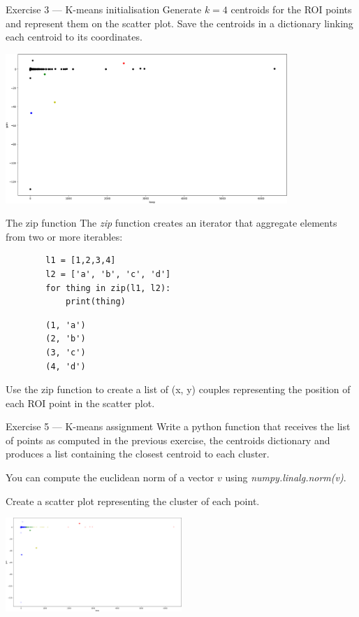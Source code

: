 \documentclass[aspectratio=169,]{beamer}
\begin{document}
\begin{frame}{Exercise 3 --- K-means initialisation}
    Generate $k=4$ centroids for the ROI points and represent them on the scatter plot.
    Save the centroids in a dictionary linking each centroid to its coordinates.

    \includegraphics[width=0.8\textwidth]{./kmeans-init.png}
\end{frame}

\begin{frame}[fragile]{The zip function}
    The \emph{zip} function creates an iterator that aggregate elements from two or more iterables:
    \begin{verbatim}
        l1 = [1,2,3,4]
        l2 = ['a', 'b', 'c', 'd']
        for thing in zip(l1, l2):
            print(thing)
    \end{verbatim}
    \begin{verbatim}
        (1, 'a')
        (2, 'b')
        (3, 'c')
        (4, 'd')
    \end{verbatim}

    Use the zip function to create a list of (x, y) couples representing the position of each ROI point in the scatter plot.
\end{frame}


\begin{frame}{Exercise 5 --- K-means assignment}
    Write a python function that receives the list of points as computed in the previous exercise, the centroids
    dictionary and produces a list containing the closest centroid to each cluster.

    You can compute the euclidean norm of a vector $v$ using \emph{numpy.linalg.norm(v)}.

    Create a scatter plot representing the cluster of each point.

    \includegraphics[width=0.5\textwidth]{./kmeans-assign.png}
\end{frame}
\end{document}
